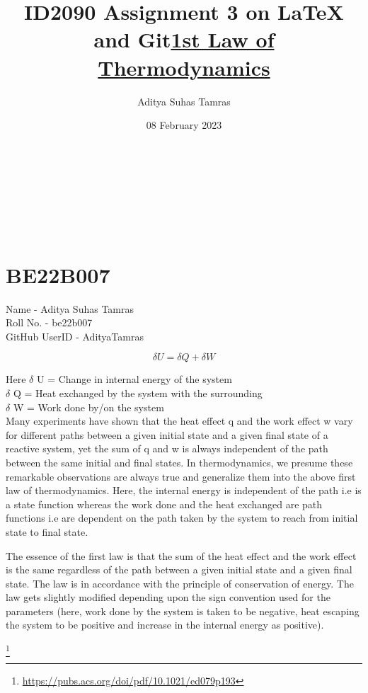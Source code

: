\title{ID2090 Assignment 3 on LaTeX and Git} \\
\author{Aditya Suhas Tamras} \\
\date{08 February 2023} \\


\maketitle

\section{BE22B007}

Name - Aditya Suhas Tamras \\
Roll No. - be22b007 \\
GitHub UserID - AdityaTamras \\ 

\title{\textbf{\underline{1st Law of Thermodynamics}}}

\begin{equation}
\delta U = \delta Q + \delta W
\end{equation}

Here $\delta$ U = Change in internal energy of the system \\
$\delta$ Q = Heat exchanged by the system with the surrounding \\
$\delta$ W = Work done by/on the system \\


Many experiments have shown that the heat effect q and
the work effect w vary for different paths between a given
initial state and a given final state of a reactive system, yet the
sum of q and w is always independent of the path between
the same initial and final states. In thermodynamics, we
presume these remarkable observations are always true and
generalize them into the above first law of thermodynamics. Here, the internal energy is independent of the path i.e is a state function whereas the work done and the heat exchanged are path functions i.e are dependent on the path taken by the system to reach from initial state to final state. 

The essence of the first law \cite{Gislason2002FirstLO} is that the sum of the heat effect and the work effect is the same regardless of the path between a given initial state
and a given final state. The law is in accordance with the principle of conservation of energy. The law gets slightly modified depending upon the sign convention used for the parameters (here, work done by the system is taken to be negative, heat escaping the system to be positive and increase in the internal energy as positive).

\footnote{


\url{https://pubs.acs.org/doi/pdf/10.1021/ed079p193}
}
